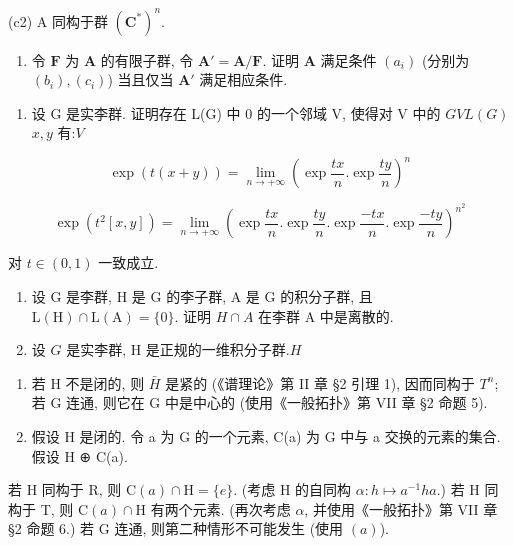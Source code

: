 (c2) A 同构于群 \((\mathbf{C}^{*})^{n}\).

\begin{enumerate}
\def\labelenumi{(\alph{enumi})}
\setcounter{enumi}{3}
\tightlist
\item
  令 \(\mathbf{F}\) 为 \(\mathbf{A}\) 的有限子群, 令 \(\mathbf{A}' = \mathbf{A} / \mathbf{F}\). 证明 \(\mathbf{A}\) 满足条件 \((a_i)\) (分别为 \((b_i), (c_i)\)) 当且仅当 \(\mathbf{A}'\) 满足相应条件.
\end{enumerate}

\begin{enumerate}
\def\labelenumi{\arabic{enumi}.}
\setcounter{enumi}{18}
\tightlist
\item
  设 G 是实李群. 证明存在 L(G) 中 0 的一个邻域 V, 使得对 V 中的 \(G\)\(V\)\(L(G)\)\(x, y\) 有:\(V\)
\end{enumerate}

\[
\exp (t (x + y)) = \lim _ {n \rightarrow + \infty} \left(\exp \frac {t x}{n}. \exp \frac {t y}{n}\right) ^ {n}
\]

\[
\exp (t ^ {2} [ x, y ]) = \lim _ {n \rightarrow + \infty} \left(\exp \frac {t x}{n}. \exp \frac {t y}{n}. \exp \frac {- t x}{n}. \exp \frac {- t y}{n}\right) ^ {n ^ {2}}
\]

对 \(t \in (0, 1)\) 一致成立.

\begin{enumerate}
\def\labelenumi{\arabic{enumi}.}
\setcounter{enumi}{19}
\item
  设 G 是李群, H 是 G 的李子群, A 是 G 的积分子群, 且 \(\mathrm{L}(\mathrm{H}) \cap \mathrm{L}(\mathrm{A}) = \{0\}\). 证明 \(H \cap A\) 在李群 A 中是离散的.
\item
  设 \(G\) 是实李群, H 是正规的一维积分子群.\(H\)
\end{enumerate}

\begin{enumerate}
\def\labelenumi{(\alph{enumi})}
\item
  若 H 不是闭的, 则 \(\bar{H}\) 是紧的 (《谱理论》第 II 章 §2 引理 1), 因而同构于 \(T^{n}\); 若 G 连通, 则它在 G 中是中心的 (使用《一般拓扑》第 VII 章 §2 命题 5).
\item
  假设 H 是闭的. 令 a 为 G 的一个元素, C(a) 为 G 中与 a 交换的元素的集合. 假设 H ⊕ C(a).
\end{enumerate}

若 H 同构于 R, 则 \(\mathrm{C}(a) \cap \mathrm{H} = \{e\}\). (考虑 H 的自同构 \(\alpha: h \mapsto a^{-1}ha\).) 若 H 同构于 T, 则 \(\mathrm{C}(a) \cap \mathrm{H}\) 有两个元素. (再次考虑 \(\alpha\), 并使用《一般拓扑》第 VII 章 §2 命题 6.) 若 G 连通, 则第二种情形不可能发生 (使用 \((a)\)).

